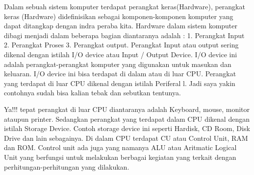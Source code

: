 Dalam sebuah sistem komputer terdapat perangkat keras(Hardware), perangkat keras (Hardware) didefinisikan sebagai komponen-komponen komputer yang dapat ditangkap dengan indra peraba kita. Hardware dalam sistem komputer dibagi menjadi dalam beberapa bagian diantaranya adalah : 1. Perangkat Input 2. Perangkat Proses 3. Perangkat output. Perangkat Input atau output sering dikenal dengan istilah I/O device atau Input / Output Device. I/O device ini adalah perangkat-perangkat komputer yang digunakan untuk masukan dan keluaran. I/O device ini bisa terdapat di dalam atau di luar CPU. Perangkat yang terdapat di luar CPU dikenal dengan istilah Periferal l. Jadi saya yakin contohnya sudah bisa kalian tebak dan sebutkan tentunya.

Ya!!! tepat perangkat di luar CPU diantaranya adalah Keyboard, mouse, monitor ataupun printer. Sedangkan perangkat yang terdapat dalam CPU dikenal dengan istilah Storage Device. Contoh storage device ini seperti Hardisk, CD Room, Disk Drive dan lain sebagainya. Di dalam CPU terdapat CU atau Control Unit, RAM dan ROM. Control unit ada juga yang namanya ALU atau Aritmatic Logical Unit yang berfungsi untuk melakukan berbagai kegiatan yang terkait dengan perhitungan-perhitungan yang dilakukan.

